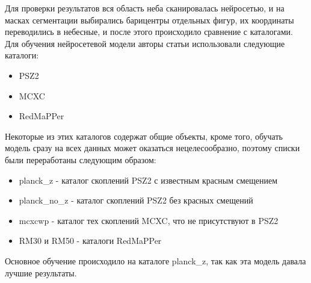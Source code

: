 Для проверки результатов вся область неба сканировалась нейросетью, и на масках сегментации 
выбирались барицентры отдельных фигур, их координаты переводились в небесные, и после этого 
происходило сравнение с каталогами.\\

Для обучения нейросетевой модели авторы статьи \cite{Bonjean} использовали следующие каталоги:\\
\begin{itemize}
    \item PSZ2\\
    \item MCXC\\
    \item RedMaPPer\\
\end{itemize}

Некоторые из этих каталогов содержат общие объекты, кроме того, обучать модель сразу на всех данных 
может оказаться нецелесообразно, поэтому списки были переработаны следующим образом:\\
\begin{itemize}
    \item planck\_z - каталог скоплений PSZ2 с известным красным смещением\\
    \item planck\_no\_z - каталог скоплений PSZ2 без красных смещений\\
    \item mcxcwp - каталог тех скоплений MCXC, что не присутствуют в PSZ2\\
    \item RM30 и RM50 - каталоги RedMaPPer\\
\end{itemize}

Основное обучение происходило на каталоге planck\_z, так как эта модель давала лучшие результаты.\\


